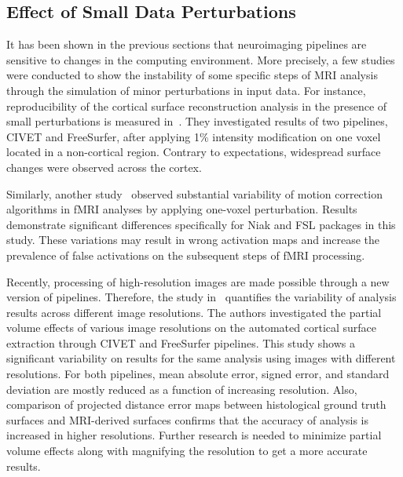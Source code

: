 \subsection{Effect of Small Data Perturbations}

It has been shown in the previous sections that neuroimaging pipelines 
are sensitive to changes in the computing environment. More precisely, 
a few studies were conducted to show the instability of some specific 
steps of MRI analysis through the simulation of minor perturbations in 
input data. For instance, reproducibility of the cortical surface 
reconstruction analysis in the presence of small perturbations is 
measured in~\cite{Lindsay2017hbm}. They investigated results of two 
pipelines, CIVET and FreeSurfer, after applying 1\% intensity 
modification on one voxel located in a non-cortical region. Contrary to 
expectations, widespread surface changes were observed across the 
cortex. 

Similarly, another study~\cite{Glatard2018hbm} observed substantial 
variability of motion correction algorithms in fMRI analyses by 
applying one-voxel perturbation. Results demonstrate significant 
differences specifically for Niak and FSL packages in this study. These 
variations may result in wrong activation maps and increase the 
prevalence of false activations on the subsequent steps of fMRI 
processing. 

Recently, processing of high-resolution images are made possible 
through a new version of pipelines. Therefore, the study 
in~\cite{Lindsay2018hbm} quantifies the variability of analysis results 
across different image resolutions. The authors investigated the 
partial volume effects of various image resolutions on the automated 
cortical surface extraction through CIVET and FreeSurfer pipelines. 
This study shows a significant variability on results for the same 
analysis using images with different resolutions. For both pipelines, 
mean absolute error, signed error, and standard deviation are mostly 
reduced as a function of increasing resolution. Also, comparison of 
projected distance error maps between histological ground truth 
surfaces and MRI-derived surfaces confirms that the accuracy of 
analysis is increased in higher resolutions. Further research is needed 
to minimize partial volume effects along with magnifying the resolution 
to get a more accurate results. 


